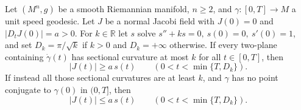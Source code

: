 Let \((M^n,g)\) be a smooth Riemannian manifold, \(n\ge2\), and \(\gamma:[0,T]\to M\) a unit speed geodesic. Let \(J\) be a normal Jacobi field with \(J(0)=0\) and \(|D_tJ(0)|=a>0\). For \(k\in\mathbb R\) let \(s\) solve
\(s''+ks=0,\ s(0)=0,\ s'(0)=1\), and set \(D_k=\pi/\sqrt{k}\) if \(k>0\) and \(D_k=+\infty\) otherwise.
If every two-plane containing \(\dot\gamma(t)\) has sectional curvature at most \(k\) for all \(t\in[0,T]\), then
\[
|J(t)|\ge a\,s(t)\qquad(0<t<\min\{T,D_k\}).
\]
If instead all those sectional curvatures are at least \(k\), and \(\gamma\) has no point conjugate to \(\gamma(0)\) in \((0,T]\), then
\[
|J(t)|\le a\,s(t)\qquad(0<t<\min\{T,D_k\}).
\]